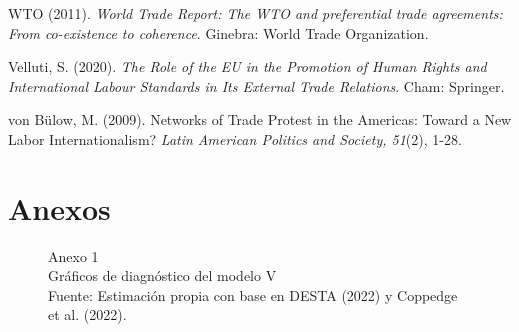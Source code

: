 \documentclass[a4paper]{tufte-handout}
\begin{document}
\begin{list}{}
\item{\small WTO (2011). {\itshape World Trade Report: The WTO and preferential trade agreements: From co-existence to coherence}. Ginebra: World Trade Organization.}

\item{\small Velluti, S. (2020). {\itshape The Role of the EU in the Promotion of Human Rights and International Labour Standards in Its External Trade Relations}. Cham: Springer.}

\item{\small von Bülow, M. (2009). Networks of Trade Protest in the Americas: Toward a New Labor Internationalism? {\itshape Latin American Politics and Society, 51}(2), 1-28.}

\end{list}


\section{{\normalfont Anexos}}


\begin{figure}[h!]
\captionsetup[subfigure]{labelformat=empty}
  \centering
  \smallskip\noindent\small Anexo 1 \\ Gráficos de diagnóstico del modelo V
  \\ \smallskip\noindent\scriptsize Fuente: Estimación propia con base en DESTA (2022) y Coppedge et al. (2022).
\end{figure}
\end{document}
